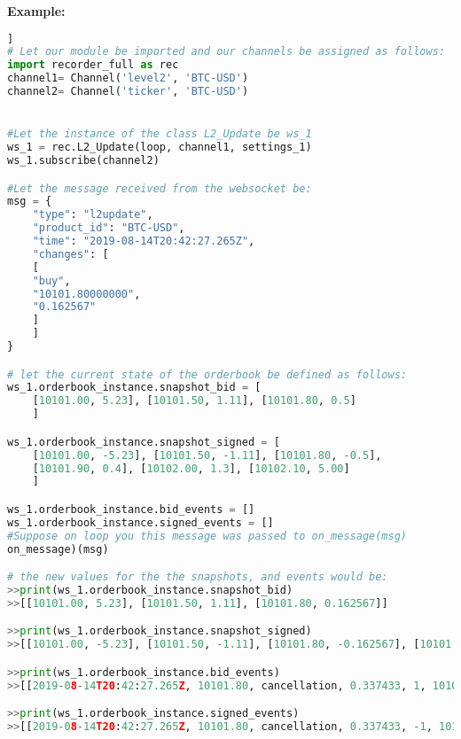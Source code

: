 \textbf{Example:}
\begin{lstlisting}[language=Python]]
# Let our module be imported and our channels be assigned as follows:
import recorder_full as rec
channel1= Channel('level2', 'BTC-USD')
channel2= Channel('ticker', 'BTC-USD')


#Let the instance of the class L2_Update be ws_1 
ws_1 = rec.L2_Update(loop, channel1, settings_1)
ws_1.subscribe(channel2)

#Let the message received from the websocket be:
msg = {
	"type": "l2update",
	"product_id": "BTC-USD",
	"time": "2019-08-14T20:42:27.265Z",
	"changes": [
	[
	"buy",
	"10101.80000000",
	"0.162567"
	]
	]
}

# let the current state of the orderbook be defined as follows:
ws_1.orderbook_instance.snapshot_bid = [
	[10101.00, 5.23], [10101.50, 1.11], [10101.80, 0.5]
	]

ws_1.orderbook_instance.snapshot_signed = [
	[10101.00, -5.23], [10101.50, -1.11], [10101.80, -0.5],
	[10101.90, 0.4], [10102.00, 1.3], [10102.10, 5.00]
	]

ws_1.orderbook_instance.bid_events = []
ws_1.orderbook_instance.signed_events = []
#Suppose on loop you this message was passed to on_message(msg)
on_message)(msg)

# the new values for the the snapshots, and events would be:
>>print(ws_1.orderbook_instance.snapshot_bid)
>>[[10101.00, 5.23], [10101.50, 1.11], [10101.80, 0.162567]]

>>print(ws_1.orderbook_instance.snapshot_signed)
>>[[10101.00, -5.23], [10101.50, -1.11], [10101.80, -0.162567], [10101.90, 0.4], [10102.00, 1.3], [10102.10, 5.00]]

>>print(ws_1.orderbook_instance.bid_events)
>>[[2019-08-14T20:42:27.265Z, 10101.80, cancellation, 0.337433, 1, 10101.85, 0.10]]

>>print(ws_1.orderbook_instance.signed_events)
>>[[2019-08-14T20:42:27.265Z, 10101.80, cancellation, 0.337433, -1, 10101.85, 0.10]]
\end{lstlisting}

